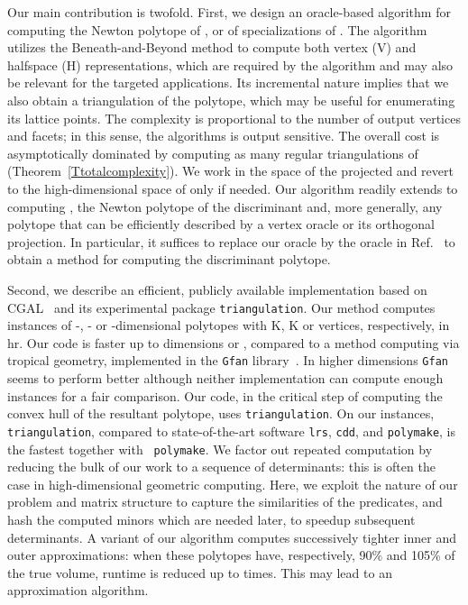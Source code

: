 \documentclass{article}
\newcommand\refcite[1]{\citealp{#1}} \newcommand\citess[1]{\textsuperscript{\textup{\citealp{#1}}}}
\begin{document}
Our main contribution is twofold.
First, we design an oracle-based algorithm for computing the
Newton polytope of , or of specializations of .  
The algorithm utilizes the Beneath-and-Beyond method to compute 
both vertex (V) and halfspace (H)
representations, which are required by the algorithm and may
also be relevant for the targeted applications.
Its incremental nature implies that we also obtain a triangulation of the
polytope, which may be useful for enumerating its lattice points.
The complexity is proportional to the number of output vertices and facets;
in this sense, the algorithms is output sensitive.
The overall cost is asymptotically dominated by computing as many
regular triangulations of  (Theorem~\ref{Ttotalcomplexity}).
We work in the space of the projected  and revert to
the high-dimensional space of  only if needed. 
Our algorithm readily extends to computing , the Newton
polytope of the discriminant
and, more generally, any polytope that can
be efficiently described by a vertex oracle or its orthogonal projection.
In particular, it suffices to replace our oracle by the oracle in
Ref.~\refcite{Rincon12} to obtain a method for computing the discriminant
polytope.

Second, we describe an efficient, publicly available implementation
based on CGAL~\citess{CGAL}
and its experimental package {\tt triangulation}.
Our method computes instances of -, - or -dimensional polytopes
with K, K or  vertices, respectively, in hr.
Our code is faster up to dimensions  or , compared to a method computing 
 via tropical geometry, implemented in the {\tt Gfan} 
library~\citess{JensenYu11}. In higher dimensions {\tt Gfan} seems to perform 
better although neither implementation can compute enough instances for a fair comparison.
Our code, in the critical step of computing the convex hull of the resultant
polytope, uses {\tt triangulation}.
On our instances, {\tt triangulation}, compared to state-of-the-art software
{\tt lrs}, {\tt cdd}, and {\tt polymake}, is the fastest together with {\tt
polymake}.
We factor out repeated computation by reducing the bulk of our
work to a sequence of determinants: this is often the case 
in high-dimensional geometric computing.
Here, we exploit the nature of our problem and matrix structure to capture the
similarities of the predicates, and hash the computed minors which are needed later,
to speedup subsequent determinants.
A variant of our algorithm computes successively tighter inner and outer
approximations: when these polytopes have, respectively,
90\% and 105\% of the true volume, runtime is reduced up to  times.
This may lead to an approximation algorithm.  
\end{document}
